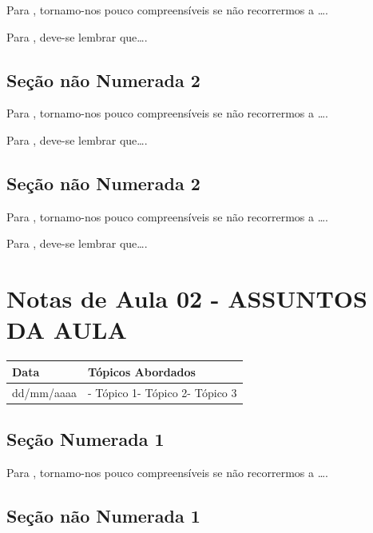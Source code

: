 \documentclass[
]{book}
\begin{document}
Para \citet{BOCK2001}, tornamo-nos pouco compreensíveis se não recorrermos a \ldots.

Para \citet{DAVIDOFF2001}, deve-se lembrar que\ldots.

\hypertarget{seuxe7uxe3o-nuxe3o-numerada-2-1}{%
\subsection*{Seção não Numerada 2}\label{seuxe7uxe3o-nuxe3o-numerada-2-1}}

Para \citet{BOCK2001}, tornamo-nos pouco compreensíveis se não recorrermos a \ldots.

Para \citet{DAVIDOFF2001}, deve-se lembrar que\ldots.

\hypertarget{seuxe7uxe3o-nuxe3o-numerada-2-2}{%
\subsection*{Seção não Numerada 2}\label{seuxe7uxe3o-nuxe3o-numerada-2-2}}

Para \citet{BOCK2001}, tornamo-nos pouco compreensíveis se não recorrermos a \ldots.

Para \citet{DAVIDOFF2001}, deve-se lembrar que\ldots.

\hypertarget{notas-de-aula-02---assuntos-da-aula}{%
\section{Notas de Aula 02 - ASSUNTOS DA AULA}\label{notas-de-aula-02---assuntos-da-aula}}

\begin{longtable}[]{@{}ll@{}}
\toprule()
Data & Tópicos Abordados \\
\midrule()
\endhead
dd/mm/aaaa & - Tópico 1- Tópico 2- Tópico 3 \\
\bottomrule()
\end{longtable}

\hypertarget{seuxe7uxe3o-numerada-1-1}{%
\subsection{Seção Numerada 1}\label{seuxe7uxe3o-numerada-1-1}}

Para \citet{BOCK2001}, tornamo-nos pouco compreensíveis se não recorrermos a \ldots.

\hypertarget{seuxe7uxe3o-nuxe3o-numerada-1-2}{%
\subsection*{Seção não Numerada 1}\label{seuxe7uxe3o-nuxe3o-numerada-1-2}}
\end{document}
